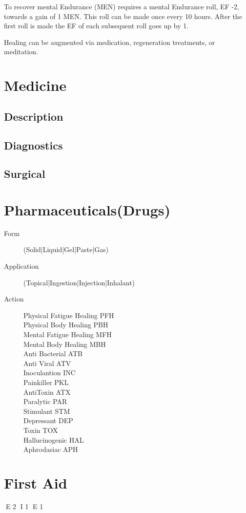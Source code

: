 To recover mental Endurance (MEN) requires a mental Endurance 
roll, EF -2, towards a gain of 1 MEN.  This roll can be made once 
every 10 hours. After the first roll is made the EF of each 
subsequent roll goes up by 1. 

Healing can be augmented via medication, regeneration treatments, or 
meditation. 

\section{Medicine}
\subsection{Description}
\subsection{Diagnostics}
\subsection{Surgical}
\section{Pharmaceuticals(Drugs)}

\begin{description}
	\item[Form]
	(Solid|Liquid|Gel|Paste|Gas)
	\item[Application]
	(Topical|Ingestion|Injection|Inhalant)
	\item[Action]
	\begin{description}
		\item[Physical Fatigue Healing PFH]
		\item[Physical Body Healing    PBH]
		\item[Mental Fatigue Healing	 MFH]
		\item[Mental Body Healing      MBH]
		\item[Anti Bacterial           ATB]
		\item[Anti Viral               ATV]
		\item[Inoculantion             INC]
		\item[Painkiller               PKL]
		\item[AntiToxin                ATX]
		\item[Paralytic                PAR]
		\item[Stimulant                STM]
		\item[Depressant               DEP]
		\item[Toxin                    TOX]
		\item[Hallucinogenic           HAL]
		\item[Aphrodasiac              APH]
	\end{description}    
\end{description}

\section{First Aid}



E 2
I 1
E 1

